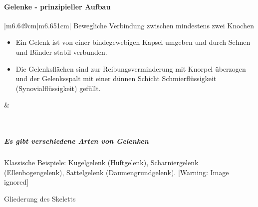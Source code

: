 \documentclass{article}
\begin{document}
\paragraph[Gelenke - \ prinzipieller Aufbau]{Gelenke -  prinzipieller
Aufbau}
\begin{center}
\tablehead{}\begin{supertabular}{|m{6.649cm}|m{6.651cm}|}
\hline
Bewegliche Verbindung zwischen mindestens zwei Knochen

\begin{itemize}
\item Ein Gelenk ist von einer bindegewebigen Kapsel umgeben und durch
Sehnen und B\"ander stabil verbunden.

\item Die Gelenksfl\"achen sind zur Reibungs\-ver\-minderung mit 
Knorpel \"uberzogen und der Gelenksspalt mit einer d\"unnen Schicht 
Schmierfl\"ussigkeit (Synovialfl\"ussigkeit) gef\"ullt. 

\end{itemize}
 &
\par

\\\hline
\end{supertabular}
\end{center}
\subparagraph{Es gibt verschiedene Arten von Gelenken}
Klassische Beispiele: Kugelgelenk (H\"uftgelenk),
Scharniergelenk (Ellenbogengelenk),
Sattelgelenk (Daumengrundgelenk).  [Warning: Image
ignored] %
 

Gliederung des Skeletts
\end{document}
